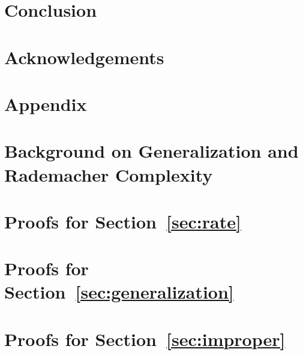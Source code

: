 \documentclass{article}
\begin{document}
\section{Conclusion}
\label{sec:con}


\section*{Acknowledgements}






\onecolumn
\newpage
\appendix

\section*{\Large Appendix}

\section{Background on Generalization and Rademacher Complexity} \label{app:rademacher}


\section{Proofs for Section~\ref{sec:rate}}
\label{app:proof_rate}


\section{Proofs for Section~\ref{sec:generalization}}
\label{app:proof_generalization}


\section{Proofs for Section~\ref{sec:improper}}
\label{app:proof_improper}

\end{document}
